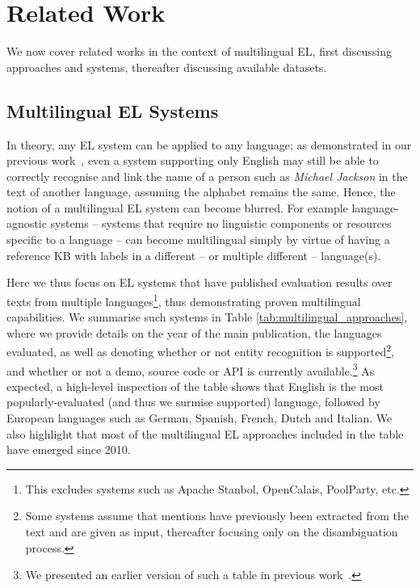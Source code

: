 \documentclass{llncs}
\begin{document}
\section{Related Work}
\label{sec:relatedWork}

We now cover related works in the context of multilingual EL, first discussing approaches and systems, thereafter discussing available datasets.

\subsection{Multilingual EL Systems}
In theory, any EL system can be applied to any language; as demonstrated in our previous work~\cite{Rosales-MendezP17}, even a system supporting only English may still be able to correctly recognise and link the name of a person such as \textit{Michael Jackson} in the text of another language, assuming the alphabet remains the same. Hence, the notion of a multilingual EL system can become blurred. For example language-agnostic systems -- systems that require no linguistic components or resources specific to a language -- can become multilingual simply by virtue of having a reference KB with labels in a different -- or multiple different -- language(s). 

Here we thus focus on EL systems that have published evaluation results over texts from multiple languages\footnote{This excludes systems such as Apache Stanbol, OpenCalais, PoolParty, etc.}, thus demonstrating proven multilingual capabilities. We summarise such systems in Table \ref{tab:multilingual_approaches}, where we provide details on the year of the main publication, the languages evaluated, as well as denoting whether or not entity recognition is supported\footnote{Some systems assume that mentions have previously been extracted from the text and are given as input, thereafter focusing only on the disambiguation process.}, and whether or not a demo, source code or API is currently available.\footnote{We presented an earlier version of such a table in previous work~\cite{Rosales-MendezP17}.} As expected, a high-level inspection of the table shows that English is the most popularly-evaluated (and thus we surmise supported) language, followed by European languages such as German, Spanish, French, Dutch and Italian. We also highlight that most of the multilingual EL approaches included in the table have emerged since 2010.
\end{document}
